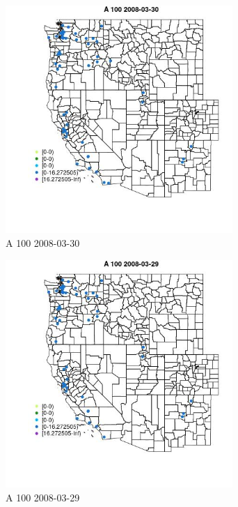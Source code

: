 \begin{figure} 
\centering  
\includegraphics[width=0.77\textwidth]{Code_Outputs/Report_ML_input_PM25_Step4_part_e_de_duplicated_aves_MapObsA_1002008-03-30.jpg} 
\caption{\label{fig:Report_ML_input_PM25_Step4_part_e_de_duplicated_avesMapObsA_1002008-03-30}A 100 2008-03-30} 
\end{figure} 
 

\begin{figure} 
\centering  
\includegraphics[width=0.77\textwidth]{Code_Outputs/Report_ML_input_PM25_Step4_part_e_de_duplicated_aves_MapObsA_1002008-03-29.jpg} 
\caption{\label{fig:Report_ML_input_PM25_Step4_part_e_de_duplicated_avesMapObsA_1002008-03-29}A 100 2008-03-29} 
\end{figure} 
 

